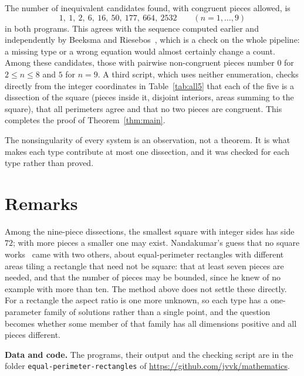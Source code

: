 \documentclass[11pt]{article}
\begin{document}
The number of inequivalent candidates found, with congruent pieces allowed, is
\[
1,\ 1,\ 2,\ 6,\ 16,\ 50,\ 177,\ 664,\ 2532 \qquad (n=1,\dots,9)
\]
in both programs. This agrees with the sequence computed earlier and independently by Beeksma and Riesebos~\cite{oeis100664}, which is a check on the whole pipeline: a missing type or a wrong equation would almost certainly change a count. Among these candidates, those with pairwise non-congruent pieces number $0$ for $2\le n\le 8$ and $5$ for $n=9$. A third script, which uses neither enumeration, checks directly from the integer coordinates in Table~\ref{tab:all5} that each of the five is a dissection of the square (pieces inside it, disjoint interiors, areas summing to the square), that all perimeters agree and that no two pieces are congruent. This completes the proof of Theorem~\ref{thm:main}.

The nonsingularity of every system is an observation, not a theorem. It is what makes each type contribute at most one dissection, and it was checked for each type rather than proved.

\begin{table}[ht]
\centering
\small

\caption{The five dissections of Theorem~\ref{thm:main}, in integer coordinates in lowest terms.}
\label{tab:all5}
\end{table}

\section{Remarks}

Among the nine-piece dissections, the smallest square with integer sides has side $72$; with more pieces a smaller one may exist. Nandakumar's guess that no square works~\cite[p.~5]{nandakumar} came with two others, about equal-perimeter rectangles with different areas tiling a rectangle that need not be square: that at least seven pieces are needed, and that the number of pieces may be bounded, since he knew of no example with more than ten. The method above does not settle these directly. For a rectangle the aspect ratio is one more unknown, so each type has a one-parameter family of solutions rather than a single point, and the question becomes whether some member of that family has all dimensions positive and all pieces different.

\textbf{Data and code.} The programs, their output and the checking script are in the folder \texttt{equal-perimeter-rectangles} of \url{https://github.com/jvvk/mathematics}.
\end{document}
